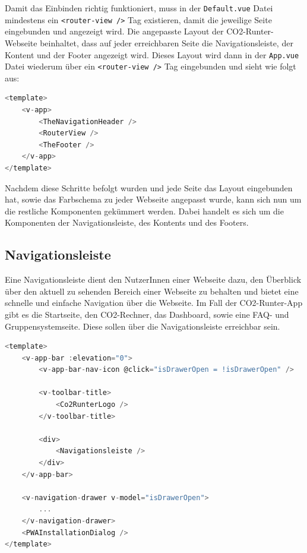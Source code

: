 Damit das Einbinden richtig funktioniert, muss in der \texttt{Default.vue} Datei mindestens ein \texttt{<router-view />} Tag existieren, damit die jeweilige Seite eingebunden und angezeigt wird. Die angepasste Layout der CO2-Runter-Webseite beinhaltet, dass auf jeder erreichbaren Seite die Navigationsleiste, der Kontent und der Footer angezeigt wird. Dieses Layout wird dann in der \texttt{App.vue} Datei wiederum über ein \texttt{<router-view />} Tag eingebunden und sieht wie folgt aus:

\begin{lstlisting}[language={JavaScript}, caption={Layout Definition}]
<template>
    <v-app>
        <TheNavigationHeader />
        <RouterView />
        <TheFooter />
    </v-app>
</template>
\end{lstlisting}

Nachdem diese Schritte befolgt wurden und jede Seite das Layout eingebunden hat, sowie das Farbschema zu jeder Webseite angepasst wurde, kann sich nun um die restliche Komponenten gekümmert werden. Dabei handelt es sich um die Komponenten der Navigationsleiste, des Kontents und des Footers.

\subsection{Navigationsleiste}

Eine Navigationsleiste dient den NutzerInnen einer Webseite dazu, den Überblick über den aktuell zu sehenden Bereich einer Webseite zu behalten und bietet eine schnelle und einfache Navigation über die Webseite. Im Fall der CO2-Runter-App gibt es die Startseite, den CO2-Rechner, das Dashboard, sowie eine FAQ- und Gruppensystemseite. Diese sollen über die Navigationsleiste erreichbar sein.

\begin{lstlisting}[language={JavaScript}, caption={Navigationsleiste für Web als auch Mobile}]
<template>
    <v-app-bar :elevation="0">
        <v-app-bar-nav-icon @click="isDrawerOpen = !isDrawerOpen" />

        <v-toolbar-title>
            <Co2RunterLogo />
        </v-toolbar-title>

        <div>
            <Navigationsleiste />
        </div>
    </v-app-bar>

    <v-navigation-drawer v-model="isDrawerOpen">
        ...
    </v-navigation-drawer>
    <PWAInstallationDialog />
</template>
\end{lstlisting}

